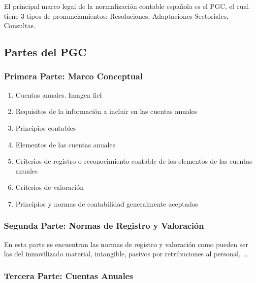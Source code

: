 \documentclass[a4paper,12pt]{article}
\begin{document}
El principal marco legal de la normalización contable española es el PGC, el cual tiene 3 tipos de pronunciamientos: Resoluciones, Adaptaciones Sectoriales, Consultas.

\subsection{Partes del PGC}
\subsubsection{Primera Parte: Marco Conceptual}
\begin{enumerate}
    \item Cuentas anuales. Imagen fiel
    \item Requisitos de la información a incluir en las cuentas anuales
    \item Principios contables
    \item Elementos de las cuentas anuales
    \item Criterios de registro o reconocimiento contable de los elementos de las cuentas anuales
    \item Criterios de valoración
    \item Principios y normas de contabilidad generalmente aceptados
\end{enumerate}

\subsubsection{Segunda Parte: Normas de Registro y Valoración}

En esta parte se encuentran las normas de registro y valoración como pueden ser las del inmovilizado material, intangible, pasivos por retribuciones al personal, \dots

\subsubsection{Tercera Parte: Cuentas Anuales}
\end{document}

